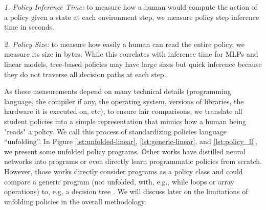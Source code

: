 \textit{1. Policy Inference Time:} to measure how a human would compute the action of a policy given a state at each environment step, we measure policy step inference time in seconds.

\textit{2. Policy Size:} to measure how easily a human can read the entire policy, we measure its size in bytes. While this correlates with inference time for MLPs and linear models, tree-based policies may have large sizes but quick inference because they do not traverse all decision paths at each step.

As these measurements depend on many technical details (programming language, the compiler if any, the operating system, versions of libraries, the hardware it is executed on, etc), to ensure fair comparisons, we translate all student policies into a simple representation that mimics how a human being "reads" a policy. We call this process of standardizing policies language ``unfolding''.
In Figure \ref{lst:unfolded-linear}, \ref{lst:generic-linear}, and \ref{lst:policy_ll}, we present some unfolded policy programs. Other works have distilled neural networks into programs \cite{PIRL} or even directly learn programmatic policies \cite{pirl2} from scratch. However, those works directly consider programs as a policy class and could compare a generic program (not unfolded, with, e.g., while loops or array operations) to, e.g, a decision tree \cite{leap}. We will discuss later on the limitations of unfolding policies in the overall methodology.

